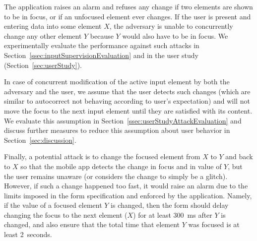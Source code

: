 The application raises an alarm and refuses any change if two elements are shown to be in focus, or if an unfocused element ever changes.
If the user is present and entering data into some element $X$, the adversary is unable to concurrently change any other element $Y$ because $Y$ would also have to be in focus.
We experimentally evaluate the performance against such attacks in Section~\ref{ssec:inputSupervisionEvaluation} and in the user study (Section~\ref{sec:userStudy}).

In case of concurrent modification of the active input element by both the adversary and the user, we assume that the user detects such changes (which are similar to autocorrect not behaving according to user's expectation) and will not move the focus to the next input element until they are satisfied with its content.
We evaluate this assumption in Section~\ref{ssec:userStudyAttackEvaluation} and discuss further measures to reduce this assumption about user behavior in Section~\ref{sec:discussion}.



Finally, a potential attack is to change the focused element from $X$ to $Y$ and back to $X$ so that the mobile app detects the change in focus and in value of $Y$, but the user remains unaware (or considers the change to simply be a glitch).
However, if such a change happened too fast, it would raise an alarm due to the limits imposed in the form specification and enforced by the application.
Namely, if the value of a focused element $Y$ is changed, then the form should delay changing the focus to the next element ($X$) for at least 300~ms after $Y$ is changed, and also ensure that the total time that element $Y$ was focused is at least 2~seconds.

